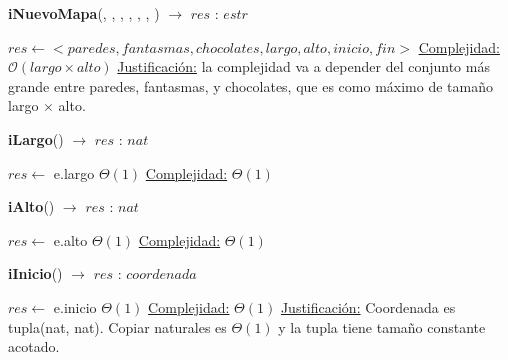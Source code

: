 \documentclass[10pt,a4paper]{article}
\begin{document}
\begin{Algoritmos}
    
    \begin{algorithm}[H]{\textbf{iNuevoMapa}(, , , ,
        , , ) $\to$ $res$ : $estr$}
        \begin{algorithmic}
            \State $res \gets <paredes, fantasmas, chocolates, largo, alto, inicio, fin>$
            \Statex \underline{Complejidad:} $\mathcal{O}(largo \times alto)$
            \Statex \underline{Justificación:} la complejidad va a depender del conjunto más grande entre
			paredes, fantasmas, y chocolates, que es como máximo de tamaño largo $\times$ alto.
        \end{algorithmic}
        \end{algorithm}

    \begin{algorithm}[H]{\textbf{iLargo}() $\to$ $res$ : $nat$}
        \begin{algorithmic}
            \State $res \gets$ e.largo \Comment $\Theta(1)$
            \Statex \underline{Complejidad:} $\Theta(1)$
        \end{algorithmic}
        \end{algorithm}
    
    \begin{algorithm}[H]{\textbf{iAlto}() $\to$ $res$ : $nat$}
        \begin{algorithmic}
            \State $res \gets$ e.alto \Comment $\Theta(1)$
            \Statex \underline{Complejidad:} $\Theta(1)$
        \end{algorithmic}
        \end{algorithm}

    \begin{algorithm}[H]{\textbf{iInicio}() $\to$ $res$ : $coordenada$}
            \begin{algorithmic}
                \State $res \gets$ e.inicio \Comment $\Theta(1)$
                \Statex \underline{Complejidad:} $\Theta(1)$
                \Statex \underline{Justificación:} Coordenada es tupla(nat, nat). Copiar naturales es $\Theta(1)$ y la tupla tiene
                tamaño constante acotado.
            \end{algorithmic}
            \end{algorithm}


\end{Algoritmos}
\end{document}
